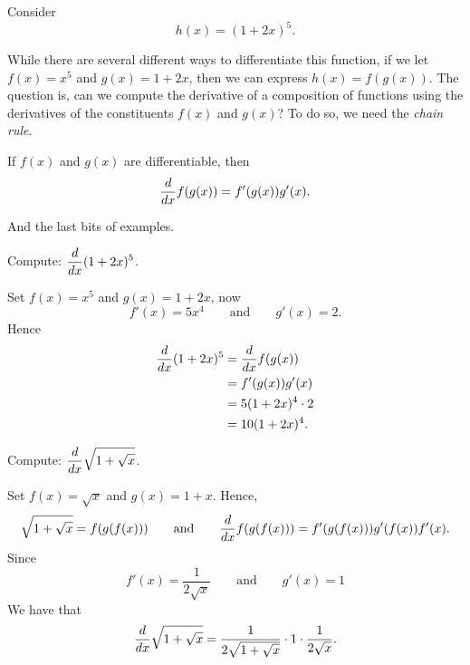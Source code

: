 Consider
$$
h(x) = (1+2x)^5.
$$

While there are several different ways to differentiate this function, if we let $f(x) = x^5$ and $g(x) = 1+2x$, then we can express $h(x) =f(g(x))$. The question is, can we compute the derivative of a composition of functions using the derivatives of the constituents $f(x)$ and $g(x)$? To do so, we need the \textit{chain rule}. \cite{mooc}

\begin{theorem}
    If $f(x)$ and $g(x)$ are differentiable, then
    $$
    \displaystyle\frac{d}{dx} f(g(x)) = f'(g(x))g'(x).
    $$
\end{theorem}

And the last bits of examples.\\

\begin{example}
    Compute: $\displaystyle\frac{d}{dx} (1+2x)^5$. \cite{mooc}
    \begin{solution}
    Set $f(x) = x^5$ and $g(x) = 1+2x$, now
    \[
    f'(x) = 5x^4 \qquad\text{and}\qquad g'(x) = 2.
    \]
    Hence
    \begin{align*}
    \displaystyle\frac{d}{dx} (1+2x)^5 &= \displaystyle\frac{d}{dx} f(g(x))\\ 
    &=f'(g(x))g'(x) \\
    &= 5(1+2x)^4\cdot 2\\
    &= 10(1+2x)^4.
    \end{align*}
    \end{solution}
\end{example}
\clearpage
\begin{example}
    Compute: $\displaystyle\frac{d}{dx} \sqrt{1+\sqrt{x}}$. \cite{mooc}
    
    \begin{solution}
    Set 
    $f(x)=\sqrt{x}$ and $g(x)=1+x$. Hence,
    \[
    \sqrt{1+\sqrt{x}}=f(g(f(x))) \qquad\text{and}\qquad\displaystyle\frac{d}{dx} f(g(f(x))) = f'(g(f(x)))g'(f(x))f'(x).
    \]
    Since 
    \[
    f'(x) = \frac{1}{2\sqrt{x}} \qquad\text{and}\qquad g'(x) = 1
    \]
    We have that
    \[
    \displaystyle\frac{d}{dx} \sqrt{1+\sqrt{x}} = \frac{1}{2\sqrt{1+\sqrt{x}}}\cdot 1\cdot  \frac{1}{2\sqrt{x}}.
    \]
    \end{solution}
\end{example}
~\\
